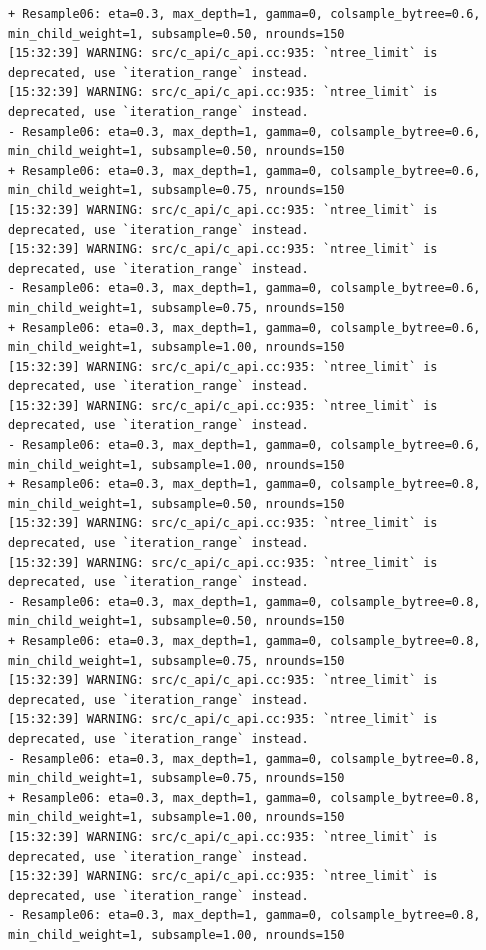 \documentclass[
  letterpaper,
  DIV=11,
  numbers=noendperiod]{scrartcl}
\begin{document}
\begin{verbatim}
+ Resample06: eta=0.3, max_depth=1, gamma=0, colsample_bytree=0.6, min_child_weight=1, subsample=0.50, nrounds=150 
[15:32:39] WARNING: src/c_api/c_api.cc:935: `ntree_limit` is deprecated, use `iteration_range` instead.
[15:32:39] WARNING: src/c_api/c_api.cc:935: `ntree_limit` is deprecated, use `iteration_range` instead.
- Resample06: eta=0.3, max_depth=1, gamma=0, colsample_bytree=0.6, min_child_weight=1, subsample=0.50, nrounds=150 
+ Resample06: eta=0.3, max_depth=1, gamma=0, colsample_bytree=0.6, min_child_weight=1, subsample=0.75, nrounds=150 
[15:32:39] WARNING: src/c_api/c_api.cc:935: `ntree_limit` is deprecated, use `iteration_range` instead.
[15:32:39] WARNING: src/c_api/c_api.cc:935: `ntree_limit` is deprecated, use `iteration_range` instead.
- Resample06: eta=0.3, max_depth=1, gamma=0, colsample_bytree=0.6, min_child_weight=1, subsample=0.75, nrounds=150 
+ Resample06: eta=0.3, max_depth=1, gamma=0, colsample_bytree=0.6, min_child_weight=1, subsample=1.00, nrounds=150 
[15:32:39] WARNING: src/c_api/c_api.cc:935: `ntree_limit` is deprecated, use `iteration_range` instead.
[15:32:39] WARNING: src/c_api/c_api.cc:935: `ntree_limit` is deprecated, use `iteration_range` instead.
- Resample06: eta=0.3, max_depth=1, gamma=0, colsample_bytree=0.6, min_child_weight=1, subsample=1.00, nrounds=150 
+ Resample06: eta=0.3, max_depth=1, gamma=0, colsample_bytree=0.8, min_child_weight=1, subsample=0.50, nrounds=150 
[15:32:39] WARNING: src/c_api/c_api.cc:935: `ntree_limit` is deprecated, use `iteration_range` instead.
[15:32:39] WARNING: src/c_api/c_api.cc:935: `ntree_limit` is deprecated, use `iteration_range` instead.
- Resample06: eta=0.3, max_depth=1, gamma=0, colsample_bytree=0.8, min_child_weight=1, subsample=0.50, nrounds=150 
+ Resample06: eta=0.3, max_depth=1, gamma=0, colsample_bytree=0.8, min_child_weight=1, subsample=0.75, nrounds=150 
[15:32:39] WARNING: src/c_api/c_api.cc:935: `ntree_limit` is deprecated, use `iteration_range` instead.
[15:32:39] WARNING: src/c_api/c_api.cc:935: `ntree_limit` is deprecated, use `iteration_range` instead.
- Resample06: eta=0.3, max_depth=1, gamma=0, colsample_bytree=0.8, min_child_weight=1, subsample=0.75, nrounds=150 
+ Resample06: eta=0.3, max_depth=1, gamma=0, colsample_bytree=0.8, min_child_weight=1, subsample=1.00, nrounds=150 
[15:32:39] WARNING: src/c_api/c_api.cc:935: `ntree_limit` is deprecated, use `iteration_range` instead.
[15:32:39] WARNING: src/c_api/c_api.cc:935: `ntree_limit` is deprecated, use `iteration_range` instead.
- Resample06: eta=0.3, max_depth=1, gamma=0, colsample_bytree=0.8, min_child_weight=1, subsample=1.00, nrounds=150 

\end{verbatim}
\end{document}
